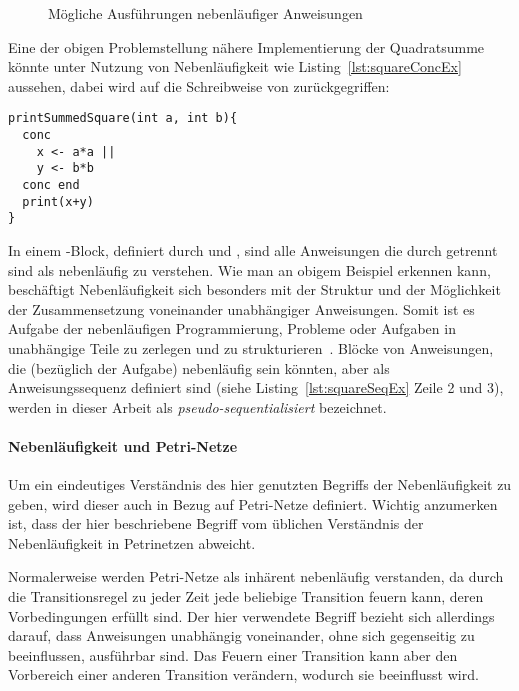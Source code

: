 \begin{figure}[hbt]
\begin{subfigure}{\textwidth}
\begin{tikzpicture}
\end{tikzpicture}
\end{subfigure}

\caption{Mögliche Ausführungen nebenläufiger Anweisungen}\label{fig:concAnweisungen}
\end{figure}

Eine der obigen Problemstellung nähere Implementierung der Quadratsumme könnte unter Nutzung von Nebenläufigkeit wie Listing~\vref{lst:squareConcEx} aussehen, dabei wird auf die Schreibweise von \textcite[S.~16]{Herrtwich1989} zurückgegriffen:
\begin{lstlisting}[caption={Beispiel eines Programms mit nebenläufigem Code in einem \code{conc}-Block. Das Programm gibt die Summe von zwei Quadratzahlen aus, wobei die Berechnung der Quadratzahlen nebenläufig stattfindet.}, label={lst:squareConcEx}]
printSummedSquare(int a, int b){
  conc 
    x <- a*a ||
    y <- b*b
  conc end
  print(x+y)
}
\end{lstlisting}
In einem -Block, definiert durch  und , sind alle Anweisungen die durch \code{||} getrennt sind als nebenläufig zu verstehen. Wie man an obigem Beispiel erkennen kann, beschäftigt Nebenläufigkeit sich besonders mit der Struktur und der Möglichkeit der Zusammensetzung voneinander unabhängiger Anweisungen. Somit ist es Aufgabe der nebenläufigen Programmierung, Probleme oder Aufgaben in unabhängige Teile zu zerlegen und zu strukturieren~\cite{Pike2012,Hettel2016}. Blöcke von Anweisungen, die (bezüglich der Aufgabe) nebenläufig sein könnten, aber als Anweisungssequenz definiert sind (siehe Listing~\vref{lst:squareSeqEx} Zeile 2 und 3), werden in dieser Arbeit als \emph{pseudo-sequentialisiert} bezeichnet.

\paragraph{Nebenläufigkeit und Petri-Netze}
Um ein eindeutiges Verständnis des hier genutzten Begriffs der Nebenläufigkeit zu geben, wird dieser auch in Bezug auf Petri-Netze definiert. Wichtig anzumerken ist, dass der hier beschriebene Begriff vom üblichen Verständnis der Nebenläufigkeit in Petrinetzen abweicht. 

Normalerweise werden Petri-Netze  als inhärent nebenläufig verstanden, da durch die Transitionsregel zu jeder Zeit jede beliebige Transition feuern kann, deren Vorbedingungen  erfüllt sind. Der hier verwendete Begriff bezieht sich allerdings darauf, dass Anweisungen unabhängig voneinander, ohne sich gegenseitig zu beeinflussen, ausführbar sind. Das Feuern einer Transition kann aber den Vorbereich einer anderen Transition verändern, wodurch sie beeinflusst wird.

